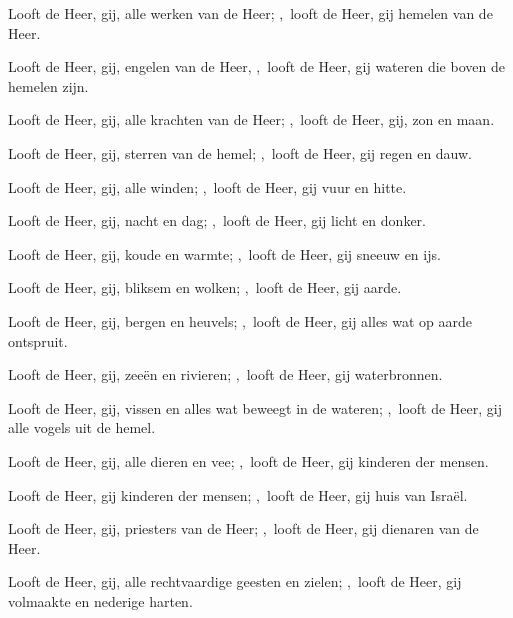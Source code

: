 \documentclass[12pt,twoside,a5paper]{article}
\begin{document}
\begin{halfparskip}
\end{halfparskip}



Looft de Heer, gij, alle werken van de Heer; \sep~looft de Heer, gij hemelen van de Heer.

\begin{halfparskip}

  Looft de Heer, gij, engelen van de Heer, \sep~looft de Heer, gij wateren die boven de hemelen zijn.

  Looft de Heer, gij, alle krachten van de Heer; \sep~looft de Heer, gij, zon en maan.

  Looft de Heer, gij, sterren van de hemel; \sep~looft de Heer, gij regen en dauw.

  Looft de Heer, gij, alle winden; \sep~looft de Heer, gij vuur en hitte.

  Looft de Heer, gij, nacht en dag; \sep~looft de Heer, gij licht en donker.

  Looft de Heer, gij, koude en warmte; \sep~looft de Heer, gij sneeuw en ijs.

  Looft de Heer, gij, bliksem en wolken; \sep~looft de Heer, gij aarde.

  Looft de Heer, gij, bergen en heuvels; \sep~looft de Heer, gij alles wat op aarde ontspruit.

  Looft de Heer, gij, zeeën en rivieren; \sep~looft de Heer, gij waterbronnen.

  Looft de Heer, gij, vissen en alles wat beweegt in de wateren; \sep~looft de Heer, gij alle vogels uit de hemel.

  Looft de Heer, gij, alle dieren en vee; \sep~looft de Heer, gij kinderen der mensen.

  Looft de Heer, gij kinderen der mensen; \sep~looft de Heer, gij huis van Israël.

  Looft de Heer, gij, priesters van de Heer; \sep~looft de Heer, gij dienaren van de Heer.

  Looft de Heer, gij, alle rechtvaardige geesten en zielen; \sep~looft de Heer, gij volmaakte en nederige harten.


\end{halfparskip}
\end{document}
